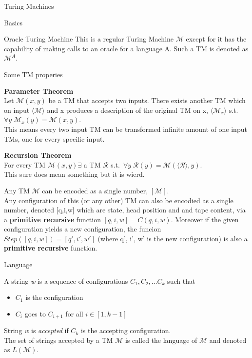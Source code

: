 \documentclass[12pt, letterpaper]{article}
\begin{document}
\begin{section}{Turing Machines}
\begin{subsection}{Basics}
\begin{subsubsection}{Oracle Turing Machine}
      This is a regular Turing Machine \(\mathscr{M}\) except for it has the
      capability of making calls to an oracle for a language A. Such a TM is
      denoted as \(\mathscr{M}^{A}\).

    \end{subsubsection}

    \begin{subsubsection}{Some TM properies}

      \textbf{Parameter Theorem} \\
      Let \(\mathscr{M}(x, y)\) be a TM that accepts two inputs. There exists
      another TM which on input \(\langle \mathscr{M} \rangle\) and x produces
      a description of the original TM on x, \(\langle \mathscr{M}_{x} \rangle\)
      s.t.\ \(\forall y \; \mathscr{M}_{x}(y) = \mathscr{M}(x, y)\). \\
      This means every two input TM can be transformed infinite amount of one
      input TMs, one for every specific input.

      \textbf{Recursion Theorem} \\
      For every TM \(\mathscr{M}(x, y) \exists\) a TM \(\mathscr{R}\) s.t.\
      \(\forall y \; \mathscr{R}(y) = \mathscr{M}(\langle \mathscr{R} \rangle, y)\). \\
      This sure does mean something but it is wierd.

      Any TM \(\mathscr{M}\) can be encoded as a single number, \([\mathscr{M}]\). \\
      Any configuration of this (or any other) TM can also be encodied as a single number,
      denoted [q,i,w] which are state, head position and and tape content, via a
      \textbf{primitive recursive} function \([q, i, w] = C(q, i, w)\).
      Moreover if the given configuration yields a new configuration, the funcion
      \(Step([q, i, w]) = [q', i', w']\) (where q', i', w' is the new configuration)
      is also a \textbf{primitive recursive} function.

    \end{subsubsection}

  \end{subsection}

  \begin{subsection}{Language}

    A string \textit{w} is a sequence of configurations \(C_{1}, C_{2}, \dots C_{k}\) such that
    \begin{itemize}
      \item \(C_{1}\) is the configuration
      \item \(C_{i}\) goes to \(C_{i+1}\) for all \(i \in [1, k - 1]\)
    \end{itemize}
    String \textit{w} is \emph{accepted} if \(C_{k}\) is the accepting configuration. \\
    The set of strings accepted by a TM \(\mathscr{M}\) is called the language of \(\mathscr{M}\)
    and denoted as \(L(\mathscr{M})\).


\end{subsection}
\end{section}
\end{document}
